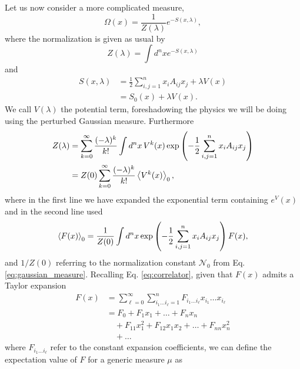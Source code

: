 \documentclass{article}
\numberwithin{equation}{section}
\begin{document}
Let us now consider a more complicated measure,
\begin{equation}
    \Omega(x) = \frac{1}{Z(\lambda)}e^{-S(x, \lambda)},
\end{equation}
where the normalization is given as usual by 
\begin{equation}
    Z(\lambda) = \int d^nx e^{-S(x,\lambda)}
\end{equation}
and
\begin{equation}
\begin{aligned}
    S(x, \lambda) &= \frac{1}{2} \sum_{i, j = 1}^n x_i A_{ij}x_j + \lambda V(x) \\
    &= S_0(x) + \lambda V(x).
\end{aligned}
\end{equation}
We call $V(\lambda)$ the potential term, foreshadowing the physics we will be doing using the perturbed Gaussian measure. Furthermore
\begin{equation}
\begin{aligned}
    Z(\lambda) &= \sum_{k=0}^\infty \frac{(-\lambda)^k}{k!} \int d^nx \, V^k(x) \exp\left(-\frac{1}{2} \sum_{i,j=1}^n x_i A_{ij} x_j\right) \\
    &= Z(0) \sum_{k=0}^\infty \frac{(-\lambda)^k}{k!} \ev{V^k(x)}_0,
\end{aligned}
\end{equation}
where in the first line we have expanded the exponential term containing $e^V(x)$ and in the second line used
\begin{equation}
    \ev{F(x)}_0 = \frac{1}{Z(0)} \int d^nx \exp\left(-\frac{1}{2} \sum_{i,j=1}^n x_i A_{ij} x_j\right) F(x),
\end{equation}
and $1/Z(0)$ referring to the normalization constant $\mathcal{N}_0$ from Eq. \ref{eq:gaussian_measure}. Recalling Eq. \ref{eq:correlator}, given that $F(x)$ admits a Taylor expansion
\begin{equation}
\begin{aligned}
    F(x) &= \sum_{\ell = 0}^\infty \sum_{i_1 \dots i_\ell = 1}^n F_{i_1 \dots i_\ell} x_{i_1} \dots x_{i_\ell} \\
    &= F_0 + F_1 x_1 + \dots + F_n x_n\\
    &\quad + F_{11} x_1^2 + F_{12} x_1 x_2 + \dots + F_{nn} x_n^2 \\
    &\quad + \dots
\end{aligned}
\end{equation}
where $F_{i_1 \dots i_\ell}$ refer to the constant expansion coefficients, we can define the expectation value of $F$ for a generic measure $\mu$ as 
\end{document}
